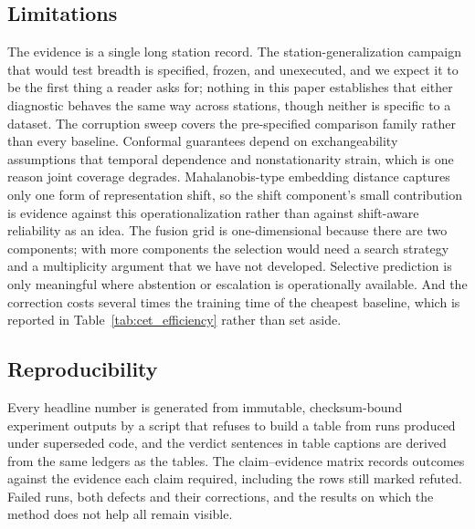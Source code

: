 \subsection{Limitations}
\label{sec:limitations}
The evidence is a single long station record. The station-generalization campaign that would test breadth is specified, frozen, and unexecuted, and we expect it to be the first thing a reader asks for; nothing in this paper establishes that either diagnostic behaves the same way across stations, though neither is specific to a dataset. The corruption sweep covers the pre-specified comparison family rather than every baseline. Conformal guarantees depend on exchangeability assumptions that temporal dependence and nonstationarity strain, which is one reason joint coverage degrades. Mahalanobis-type embedding distance captures only one form of representation shift, so the shift component's small contribution is evidence against this operationalization rather than against shift-aware reliability as an idea. The fusion grid is one-dimensional because there are two components; with more components the selection would need a search strategy and a multiplicity argument that we have not developed. Selective prediction is only meaningful where abstention or escalation is operationally available. And the correction costs several times the training time of the cheapest baseline, which is reported in Table~\ref{tab:cet_efficiency} rather than set aside.

\subsection{Reproducibility}
Every headline number is generated from immutable, checksum-bound experiment outputs by a script that refuses to build a table from runs produced under superseded code, and the verdict sentences in table captions are derived from the same ledgers as the tables. The claim--evidence matrix records outcomes against the evidence each claim required, including the rows still marked refuted. Failed runs, both defects and their corrections, and the results on which the method does not help all remain visible.

